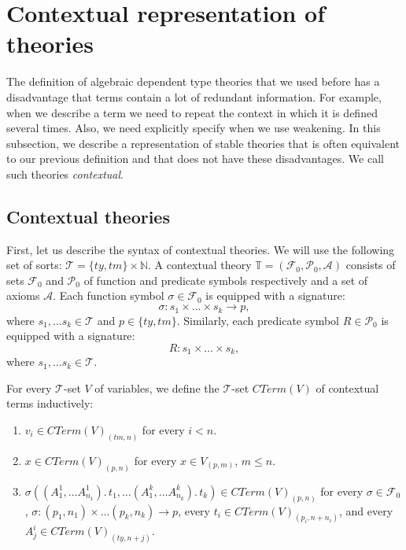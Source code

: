 \documentclass[reqno]{amsart}
\theoremstyle{definition}
\theoremstyle{remark}
\numberwithin{figure}{section}
\begin{document}
\section{Contextual representation of theories}

The definition of algebraic dependent type theories that we used before has a disadvantage that terms contain a lot of redundant information.
For example, when we describe a term we need to repeat the context in which it is defined several times.
Also, we need explicitly specify when we use weakening.
In this subsection, we describe a representation of stable theories that is often equivalent to our previous definition and that does not have these disadvantages.
We call such theories \emph{contextual}.

\subsection{Contextual theories}

First, let us describe the syntax of contextual theories.
We will use the following set of sorts: $\mathcal{T} = \{ty,tm\} \times \mathbb{N}$.
A contextual theory $\mathbb{T} = (\mathcal{F}_0,\mathcal{P}_0,\mathcal{A})$ consists of sets $\mathcal{F}_0$ and $\mathcal{P}_0$ of function and predicate symbols respectively and a set of axioms $\mathcal{A}$.
Each function symbol $\sigma \in \mathcal{F}_0$ is equipped with a signature:
\[ \sigma : s_1 \times \ldots \times s_k \to p, \]
where $s_1, \ldots s_k \in \mathcal{T}$ and $p \in \{ty,tm\}$.
Similarly, each predicate symbol $R \in \mathcal{P}_0$ is equipped with a signature:
\[ R : s_1 \times \ldots \times s_k, \]
where $s_1, \ldots s_k \in \mathcal{T}$.

For every $\mathcal{T}$-set $V$ of variables, we define the $\mathcal{T}$-set $CTerm(V)$ of contextual terms inductively:
\begin{enumerate}
\item $v_i \in CTerm(V)_{(tm,n)}$ for every $i < n$.
\item $x \in CTerm(V)_{(p,n)}$ for every $x \in V_{(p,m)}$, $m \leq n$.
\item $\sigma((A^1_1, \ldots A^1_{n_1}).\,t_1, \ldots (A^k_1, \ldots A^k_{n_k}).\,t_k) \in CTerm(V)_{(p,n)}$
for every $\sigma \in \mathcal{F}_0$, $\sigma : (p_1,n_1) \times \ldots (p_k,n_k) \to p$, every $t_i \in CTerm(V)_{(p_i,n+n_i)}$, and every $A^i_j \in CTerm(V)_{(ty,n+j)}$.
\end{enumerate}
\end{document}
